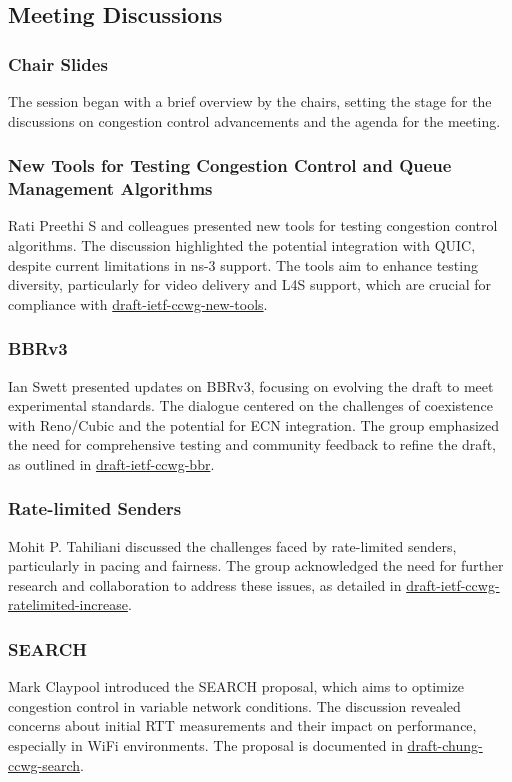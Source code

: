 \documentclass{article}
\begin{document}
\subsection{Meeting Discussions}

\subsubsection{Chair Slides}
The session began with a brief overview by the chairs, setting the stage for the discussions on congestion control advancements and the agenda for the meeting.

\subsubsection{New Tools for Testing Congestion Control and Queue Management Algorithms}
Rati Preethi S and colleagues presented new tools for testing congestion control algorithms. The discussion highlighted the potential integration with QUIC, despite current limitations in ns-3 support. The tools aim to enhance testing diversity, particularly for video delivery and L4S support, which are crucial for compliance with \href{https://datatracker.ietf.org/doc/html/draft-ietf-ccwg-new-tools}{draft-ietf-ccwg-new-tools}.

\subsubsection{BBRv3}
Ian Swett presented updates on BBRv3, focusing on evolving the draft to meet experimental standards. The dialogue centered on the challenges of coexistence with Reno/Cubic and the potential for ECN integration. The group emphasized the need for comprehensive testing and community feedback to refine the draft, as outlined in \href{https://datatracker.ietf.org/doc/html/draft-ietf-ccwg-bbr}{draft-ietf-ccwg-bbr}.

\subsubsection{Rate-limited Senders}
Mohit P. Tahiliani discussed the challenges faced by rate-limited senders, particularly in pacing and fairness. The group acknowledged the need for further research and collaboration to address these issues, as detailed in \href{https://datatracker.ietf.org/doc/html/draft-ietf-ccwg-ratelimited-increase}{draft-ietf-ccwg-ratelimited-increase}.

\subsubsection{SEARCH}
Mark Claypool introduced the SEARCH proposal, which aims to optimize congestion control in variable network conditions. The discussion revealed concerns about initial RTT measurements and their impact on performance, especially in WiFi environments. The proposal is documented in \href{https://datatracker.ietf.org/doc/html/draft-chung-ccwg-search}{draft-chung-ccwg-search}.
\end{document}
